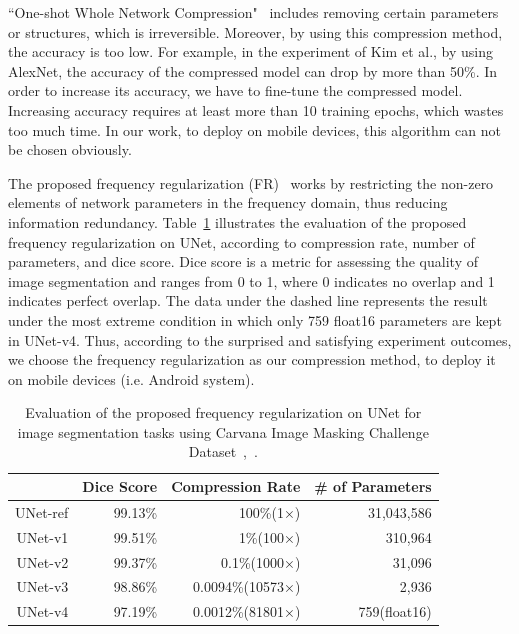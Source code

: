 \documentclass[runningheads]{llncs}
\begin{document}
``One-shot Whole Network Compression"~\cite{kim2016oneshot} includes removing certain parameters or structures, which is irreversible. Moreover, by using this compression method, the accuracy is too low. For example, in the experiment of Kim et al., by using AlexNet, the accuracy of the compressed model can drop by more than 50\%. In order to increase its accuracy, we have to fine-tune the compressed model. Increasing accuracy requires at least more than 10 training epochs, which wastes too much time. In our work, to deploy on mobile devices, this algorithm can not be chosen obviously. 

The proposed frequency regularization (FR)~\cite{zhao2023fr} works by restricting the non-zero elements of network parameters in the frequency domain, thus reducing information redundancy. Table~\ref{table:fr_unet} illustrates the evaluation of the proposed frequency regularization on UNet, according to compression rate, number of parameters, and dice score. Dice score is a metric for assessing the quality of image segmentation and ranges from 0 to 1, where 0 indicates no overlap and 1 indicates perfect overlap. The data under the dashed line represents the result under the most extreme condition in which only 759 float16 parameters are kept in UNet-v4. Thus, according to the surprised and satisfying experiment outcomes, we choose the frequency regularization as our compression method, to deploy it on mobile devices (i.e. Android system).

\begin{table}[H]
	\caption{Evaluation of the proposed frequency regularization on UNet for image segmentation tasks using Carvana Image Masking Challenge Dataset~\cite{zhao2023fr},~\cite{brian2017carvanadataset}.} 
	\label{table:fr_unet}
	\small
	\centering
	\begin{tabular}{rrrr}
		\toprule
		&Dice Score&Compression Rate&\# of Parameters\\ 
		\midrule\midrule
		UNet-ref&99.13\%&100\%(1×)&31,043,586\\
		UNet-v1&99.51\%&1\%(100×)&310,964\\
		UNet-v2&99.37\%&0.1\%(1000×)&31,096\\
		UNet-v3&98.86\%&0.0094\%(10573×)&2,936\\
		\cdashline{1-4}
		UNet-v4&97.19\%&0.0012\%(81801×)&759(float16)\\
		\bottomrule
	\end{tabular}
\end{table}
\end{document}
